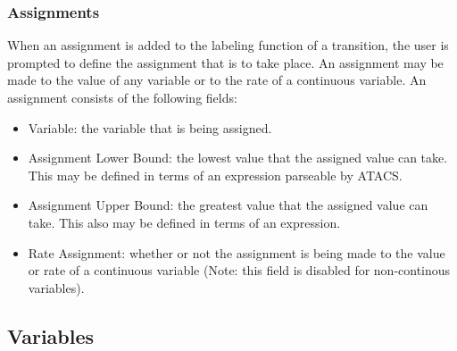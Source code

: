 \documentclass[titlepage,11pt]{article}
\begin{document}
\subsubsection{\label{assignments}Assignments}
\noindent
When an assignment is added to the labeling function of a transition, the user
is prompted to define the assignment that is to take place.  An assignment may
be made to the value of any variable or to the rate of a continuous variable.
An assignment consists of the following fields:
\begin{itemize}
\item Variable: the variable that is being assigned.
\item Assignment Lower Bound: the lowest value that the assigned value can take.
       This may be defined in terms of an expression parseable by ATACS.
\item Assignment Upper Bound: the greatest value that the assigned value can 
       take.  This also may be defined in terms of an expression.
\item Rate Assignment: whether or not the assignment is being made to the value
       or rate of a continuous variable (Note: this field is disabled for
       non-continous variables).
\end{itemize}

\subsection{\label{variables}Variables}
\end{document}
